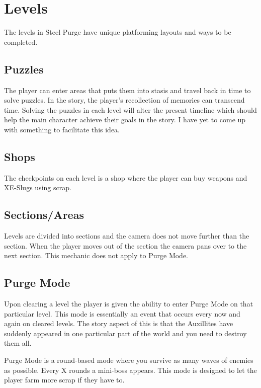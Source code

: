 \documentclass[../Main.tex]{subfiles}
\begin{document}
\section{Levels}

The levels in Steel Purge have unique platforming layouts and ways to be completed.

\subsection{Puzzles}

The player can enter areas that puts them into stasis and travel back in time to solve puzzles. In the story, the player's recollection of memories can transcend time. Solving the puzzles in each level will alter the present timeline which should help the main character achieve their goals in the story. I have yet to come up with something to facilitate this idea. 

\subsection{Shops}

The checkpoints on each level is a shop where the player can buy weapons and XE-Slugs using scrap.

\subsection{Sections/Areas}

Levels are divided into sections and the camera does not move further than the section. When the player moves out of the section the camera pans over to the next section. This mechanic does not apply to Purge Mode.

\subsection{Purge Mode}

Upon clearing a level the player is given the ability to enter Purge Mode on that particular level. This mode is essentially an event that occurs every now and again on cleared levels. The story aspect of this is that the Auxillites have suddenly appeared in one particular part of the world and you need to destroy them all.

Purge Mode is a round-based mode where you survive as many waves of enemies as possible. Every X rounds a mini-boss appears. This mode is designed to let the player farm more scrap if they have to.
\end{document}
